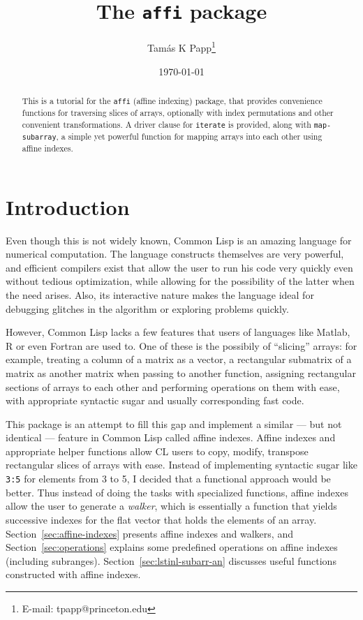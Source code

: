 \documentclass[letterpaper,11pt]{article}
\begin{document}
\title{The \lstinline!affi! package}
\author{Tam\'as K Papp\thanks{E-mail: tpapp@princeton.edu}}
\date{\today}
\maketitle

\begin{abstract}
  This is a tutorial for the \lstinline!affi! (affine indexing)
  package, that provides convenience functions for traversing slices
  of arrays, optionally with index permutations and other convenient
  transformations.  A driver clause for \lstinline!iterate! is
  provided, along with \lstinline!map-subarray!, a simple yet powerful
  function for mapping arrays into each other using affine indexes.
\end{abstract}

\section{Introduction}
\label{sec:introduction}

Even though this is not widely known, Common Lisp is an amazing
language for numerical computation.  The language constructs
themselves are very powerful, and efficient compilers exist that allow
the user to run his code very quickly even without tedious
optimization, while allowing for the possibility of the latter when
the need arises.  Also, its interactive nature makes the language
ideal for debugging glitches in the algorithm or exploring problems
quickly.

However, Common Lisp lacks a few features that users of languages like
Matlab, R or even Fortran are used to.  One of these is the possibily
of ``slicing'' arrays: for example, treating a column of a matrix as a
vector, a rectangular submatrix of a matrix as another matrix when
passing to another function, assigning rectangular sections of arrays
to each other and performing operations on them with ease, with
appropriate syntactic sugar and usually corresponding fast code.

This package is an attempt to fill this gap and implement a similar
--- but not identical --- feature in Common Lisp called affine
indexes.  Affine indexes and appropriate helper functions allow CL
users to copy, modify, transpose rectangular slices of arrays with
ease.  Instead of implementing syntactic sugar like \verb!3:5! for
elements from 3 to 5, I decided that a functional approach would be
better.  Thus instead of doing the tasks with specialized functions,
affine indexes allow the user to generate a \emph{walker}, which is
essentially a function that yields successive indexes for the flat
vector that holds the elements of an array.
Section~\ref{sec:affine-indexes} presents affine indexes and walkers, and
Section~\ref{sec:operations} explains some predefined operations on
affine indexes (including subranges).  Section~\ref{sec:lstinl-subarr-an}
discusses useful functions constructed with affine indexes.
\end{document}
